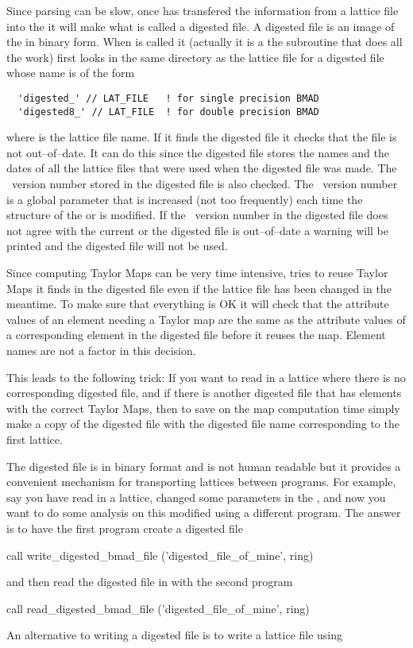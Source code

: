 Since parsing can be slow, once  has transfered the
information from a lattice file into the  it will make
what is called a digested file. A digested file is an image of the
 in binary form. When  is called it
(actually it is a the subroutine  that
does all the work) first looks in the same directory as the lattice
file for a digested file whose name is of the form
\begin{verbatim}
  'digested_' // LAT_FILE   ! for single precision BMAD 
  'digested8_' // LAT_FILE  ! for double precision BMAD 
\end{verbatim}
where  is the lattice file name. If it finds the digested
file it checks that the file is not out--of--date. It can do this
since the digested file stores the names and the dates of all the
lattice files that were used when the digested file was made. The
\bmad\ version number stored in the digested file is also checked. The
\bmad\ version number is a global parameter that is increased (not too
frequently) each time the structure of the  or
 is modified. If the \bmad\ version number in the
digested file does not agree with the current or the digested file is
out--of--date a warning will be printed and the digested file will not
be used.

Since computing Taylor Maps can be very time intensive,
 tries to reuse Taylor Maps it finds in the digested
file even if the lattice file has been changed in the meantime. To
make sure that everything is OK it will check that the attribute
values of an element needing a Taylor map are the same as the
attribute values of a corresponding element in the digested file
before it reuses the map. Element names are not a factor in this
decision.

This leads to the following trick: If you want to read in a lattice
where there is no corresponding digested file, and if there is another
digested file that has elements with the correct Taylor Maps, then to
save on the map computation time simply make a copy of the digested
file with the digested file name corresponding to the first lattice.

The digested file is in binary format and is not human readable but it
provides a convenient mechanism for transporting lattices between
programs. For example, say you have read in a lattice, changed
some parameters in the , and now you want to do some
analysis on this modified  using a different program. The 
answer is to have the first program create a digested file
\begin{example}
  call write_digested_bmad_file ('digested_file_of_mine', ring)
\end{example}
and then read the digested file in with the second program
\begin{example}
  call read_digested_bmad_file ('digested_file_of_mine', ring)
\end{example}
An alternative to writing a digested file is to write a lattice file
using 
